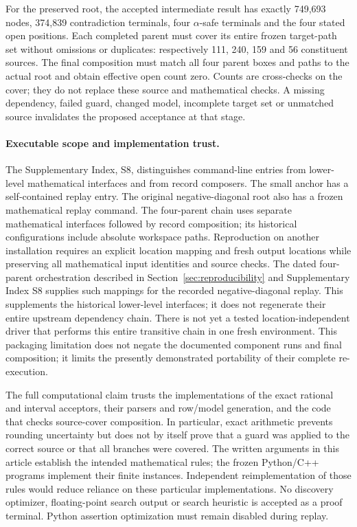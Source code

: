\documentclass[11pt,reqno]{amsart}
\theoremstyle{definition}
\theoremstyle{remark}
\begin{document}
For the preserved root, the accepted intermediate result has exactly
749,693 nodes, 374,839 contradiction terminals, four \(\alpha\)-safe
terminals and the four stated open positions. Each completed parent
must cover its entire frozen target-path set without omissions or
duplicates: respectively 111, 240, 159 and 56 constituent sources.
The final composition must match all four parent boxes and paths to
the actual root and obtain effective open count zero. Counts are
cross-checks on the cover; they do not replace these source and
mathematical checks. A missing dependency, failed guard, changed model,
incomplete target set or unmatched source invalidates the proposed
acceptance at that stage.

\paragraph{Executable scope and implementation trust.}
The Supplementary Index, S8, distinguishes command-line entries from
lower-level mathematical interfaces and from record composers.
The small anchor has a self-contained replay entry. The original
negative-diagonal root also has a frozen mathematical replay command.
The four-parent chain uses separate mathematical interfaces followed
by record composition; its historical configurations include absolute
workspace paths. Reproduction on another installation requires an
explicit location mapping and fresh output locations while preserving
all mathematical input identities and source checks. The dated
four-parent orchestration described in Section~\ref{sec:reproducibility}
and Supplementary Index S8 supplies such mappings for the recorded
negative-diagonal replay.  This supplements the historical lower-level
interfaces; it does not regenerate their entire upstream dependency chain.
There is not yet
a tested location-independent driver that performs this entire
transitive chain in one fresh environment. This packaging limitation
does not negate the documented component runs and final composition;
it limits the presently demonstrated portability of their complete
re-execution.

The full computational claim trusts the implementations of the exact
rational and interval acceptors, their parsers and row/model
generation, and the code that checks source-cover composition.
In particular, exact arithmetic prevents rounding uncertainty but
does not by itself prove that a guard was applied to the correct
source or that all branches were covered. The written arguments in
this article establish the intended mathematical rules; the frozen
Python/C++ programs implement their finite instances. Independent
reimplementation of those rules would reduce reliance on these
particular implementations. No discovery optimizer, floating-point
search output or search heuristic is accepted as a proof terminal.
Python assertion optimization must remain disabled during replay.
\end{document}
